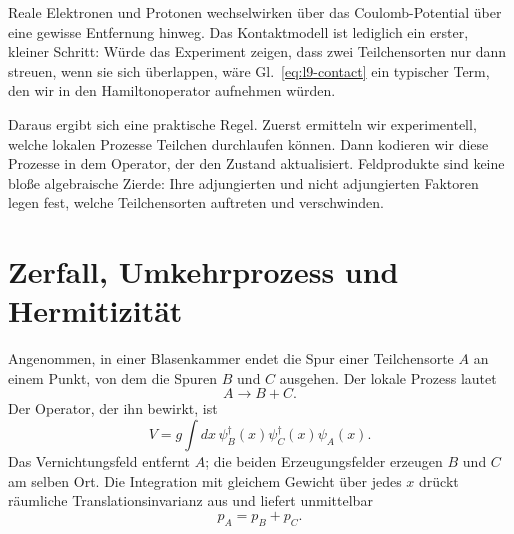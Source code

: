 Reale Elektronen und Protonen wechselwirken über das Coulomb-Potential über eine gewisse Entfernung hinweg. Das Kontaktmodell ist lediglich ein erster, kleiner Schritt: Würde das Experiment zeigen, dass zwei Teilchensorten nur dann streuen, wenn sie sich überlappen, wäre Gl.~\eqref{eq:l9-contact} ein typischer Term, den wir in den Hamiltonoperator aufnehmen würden.

\begin{classroomqa}\end{classroomqa}

Daraus ergibt sich eine praktische Regel. Zuerst ermitteln wir experimentell, welche lokalen Prozesse Teilchen durchlaufen können. Dann kodieren wir diese Prozesse in dem Operator, der den Zustand aktualisiert. Feldprodukte sind keine bloße algebraische Zierde: Ihre adjungierten und nicht adjungierten Faktoren legen fest, welche Teilchensorten auftreten und verschwinden.

\section{Zerfall, Umkehrprozess und Hermitizität}

Angenommen, in einer Blasenkammer endet die Spur einer Teilchensorte \(A\) an einem Punkt, von dem die Spuren \(B\) und \(C\) ausgehen. Der lokale Prozess lautet
\begin{equation}
A\longrightarrow B+C.
\end{equation}
Der Operator, der ihn bewirkt, ist
\begin{equation}
V=g\int dx\,
\psi_B^\dagger(x)\psi_C^\dagger(x)\psi_A(x).
\label{eq:l9-decay-half}
\end{equation}
Das Vernichtungsfeld entfernt \(A\); die beiden Erzeugungsfelder erzeugen \(B\) und \(C\) am selben Ort. Die Integration mit gleichem Gewicht über jedes \(x\) drückt räumliche Translationsinvarianz aus und liefert unmittelbar
\begin{equation}
p_A=p_B+p_C.
\end{equation}

